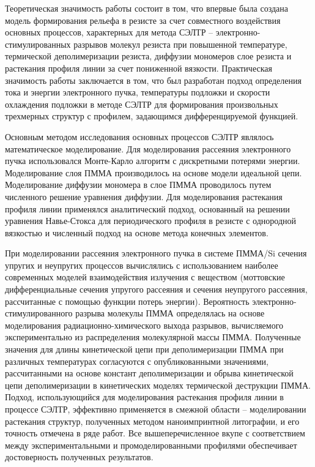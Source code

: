 \influence

Теоретическая значимость работы состоит в том, что впервые была создана модель формирования рельефа в резисте за счет совместного воздействия основных процессов, характерных для метода СЭЛТР -- электронно-стимулированных разрывов молекул резиста при повышенной температуре, термической деполимеризации резиста, диффузии мономеров слое резиста и растекания профиля линии за счет пониженной вязкости.
Практическая значимость работы заключается в том, что был разработан подход определения тока и энергии электронного пучка, температуры подложки и скорости охлаждения подложки в методе СЭЛТР для формирования произвольных трехмерных структур с профилем, задающимся дифференцируемой функцией.


\methods

Основным методом исследования основных процессов СЭЛТР являлось математическое моделирование. Для моделирования рассеяния электронного пучка использовался Монте-Карло алгоритм с дискретными потерями энергии. Моделирование слоя ПММА производилось на основе модели идеальной цепи. Моделирование диффузии мономера в слое ПММА проводилось путем численного решение уравнения диффузии. Для моделирования растекания профиля линии применялся аналитический подход, основанный на решении уравнения Навье-Стокса для периодического профиля в резисте с однородной вязкостью и численный подход на основе метода конечных элементов.


\probation

При моделировании рассеяния электронного пучка в системе ПММА/Si сечения упругих и неупругих процессов вычислялись с использованием наиболее современных моделей взаимодействия излучения с веществом (моттовские дифференциальные сечения упругого рассеяния и сечения неупругого рассеяния, рассчитанные с помощью функции потерь энергии). Вероятность электронно-стимулированного разрыва молекулы ПММА определялась на основе моделирования радиационно-химического выхода разрывов, вычисляемого экспериментально из распределения молекулярной массы ПММА. Полученные значения для длины кинетической цепи при деполимеризации ПММА при различных температурах согласуются с опубликованными значениями, рассчитанными на основе констант деполимеризации и обрыва кинетической цепи деполимеризации в кинетических моделях термической деструкции ПММА. Подход, использующийся для моделирования растекания профиля линии в процессе СЭЛТР, эффективно применяется в смежной области -- моделировании растекания структур, полученных методом наноимпринтной литографии, и его точность отмечена в ряде работ. Все вышеперечисленное вкупе с соответствием между экспериментальными и промоделированными профилями обеспечивает достоверность полученных результатов.

